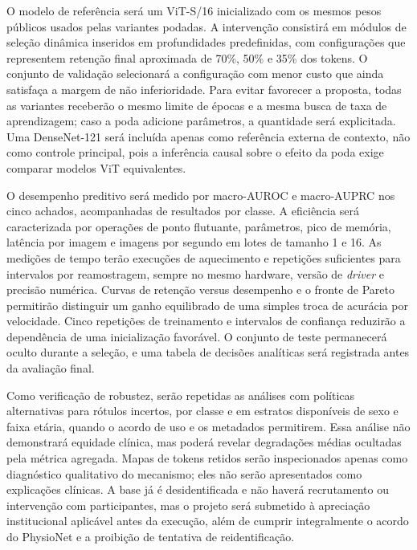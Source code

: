 \documentclass[10pt,a4paper]{extarticle}
\begin{document}
O modelo de referência será um ViT-S/16 inicializado com os mesmos pesos públicos usados pelas variantes podadas. A intervenção consistirá em módulos de seleção dinâmica inseridos em profundidades predefinidas, com configurações que representem retenção final aproximada de 70\%, 50\% e 35\% dos tokens. O conjunto de validação selecionará a configuração com menor custo que ainda satisfaça a margem de não inferioridade. Para evitar favorecer a proposta, todas as variantes receberão o mesmo limite de épocas e a mesma busca de taxa de aprendizagem; caso a poda adicione parâmetros, a quantidade será explicitada. Uma DenseNet-121 será incluída apenas como referência externa de contexto, não como controle principal, pois a inferência causal sobre o efeito da poda exige comparar modelos ViT equivalentes.

O desempenho preditivo será medido por macro-AUROC e macro-AUPRC nos cinco achados, acompanhadas de resultados por classe. A eficiência será caracterizada por operações de ponto flutuante, parâmetros, pico de memória, latência por imagem e imagens por segundo em lotes de tamanho 1 e 16. As medições de tempo terão execuções de aquecimento e repetições suficientes para intervalos por reamostragem, sempre no mesmo hardware, versão de \emph{driver} e precisão numérica. Curvas de retenção versus desempenho e o fronte de Pareto permitirão distinguir um ganho equilibrado de uma simples troca de acurácia por velocidade. Cinco repetições de treinamento e intervalos de confiança reduzirão a dependência de uma inicialização favorável. O conjunto de teste permanecerá oculto durante a seleção, e uma tabela de decisões analíticas será registrada antes da avaliação final.

Como verificação de robustez, serão repetidas as análises com políticas alternativas para rótulos incertos, por classe e em estratos disponíveis de sexo e faixa etária, quando o acordo de uso e os metadados permitirem. Essa análise não demonstrará equidade clínica, mas poderá revelar degradações médias ocultadas pela métrica agregada. Mapas de tokens retidos serão inspecionados apenas como diagnóstico qualitativo do mecanismo; eles não serão apresentados como explicações clínicas. A base já é desidentificada e não haverá recrutamento ou intervenção com participantes, mas o projeto será submetido à apreciação institucional aplicável antes da execução, além de cumprir integralmente o acordo do PhysioNet e a proibição de tentativa de reidentificação.
\end{document}
